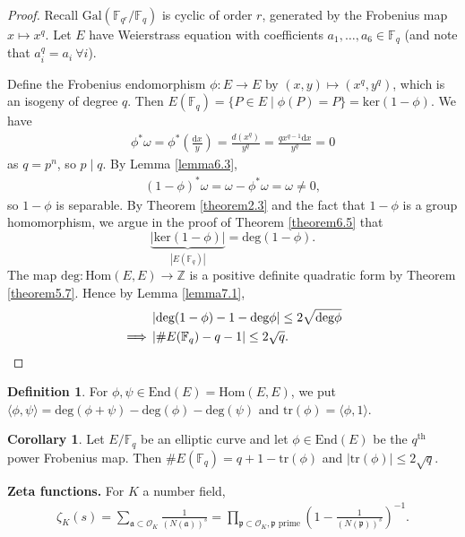 \documentclass{article}
\theoremstyle{definition}
\newtheorem{cor}[theorem]{Corollary}
\newtheorem{defn}{Definition}[section]
\begin{document}
\begin{proof}
    Recall $\text{Gal}(\mathbb{F}_{q^r}/\mathbb{F}_q)$ is cyclic of order $r$, generated by the Frobenius map $x \mapsto x^q$. Let $E$ have Weierstrass equation with coefficients $a_1,\ldots,a_6 \in \mathbb{F}_q$ (and note that $a_i^q = a_i ~\forall i$). 
    \vspace{1mm}
     
    Define the Frobenius endomorphism $\phi: E \to E$ by $(x,y) \mapsto (x^q,y^q)$, which is an isogeny of degree $q$. Then $E(\mathbb{F}_q) = \{P \in E \mid \phi(P) = P\} = \text{ker}(1-\phi)$. We have
    \begin{align*}
        \phi^* \omega = \phi^* \left(\frac{\mathrm{d}x}{y}\right) = \frac{d(x^q)}{y^q} = \frac{qx^{q-1}\mathrm{d}x}{y^q} = 0
    \end{align*}
    as $q=p^n$, so $p \mid q$. By Lemma \ref{lemma6.3},
    \begin{align*}
        (1-\phi)^* \omega = \omega - \phi^* \omega = \omega \neq 0,
    \end{align*}
    so $1-\phi$ is separable. By Theorem \ref{theorem2.3} and the fact that $1-\phi$ is a group homomorphism, we argue in the proof of Theorem \ref{theorem6.5} that $$\underbrace{\left|\text{ker}(1-\phi)\right|}_{\left|E(\mathbb{F}_q)\right|} = \text{deg}(1-\phi).$$
    The map $\text{deg}: \text{Hom}(E,E) \to \mathbb{Z}$ is a positive definite quadratic form by Theorem \ref{theorem5.7}. Hence by Lemma \ref{lemma7.1}, 
    \begin{align*}
        &\left|\text{deg}(1-\phi) - 1 - \text{deg}\phi\right|\le 2\sqrt{\text{deg}\phi}\\
        \implies&\left|\# E(\mathbb{F}_q)-q-1\right| \le 2\sqrt{q}.
        \qedhere
    \end{align*}
\end{proof}
\begin{defn}
    For $\phi, \psi \in \text{End}(E) = \text{Hom}(E,E)$, we put $\langle \phi, \psi \rangle = \text{deg}(\phi+\psi)-\text{deg}(\phi)-\text{deg}(\psi)$ and $\text{tr}(\phi) = \langle \phi,1 \rangle$.
\end{defn}
\begin{cor}\label{cor7.3}
    Let $E/\mathbb{F}_q$ be an elliptic curve and let $\phi \in \text{End}(E)$ be the $q^{\text{th}}$ power Frobenius map. Then $\# E(\mathbb{F}_q) = q+1 - \text{tr}(\phi)$ and $\left|\text{tr}(\phi)\right|\le 2\sqrt{q}$.
\end{cor}
\textbf{Zeta functions.} For $K$ a number field, 
\begin{align*}
    \zeta_K(s) = \sum_{\mathfrak{a} \subset \mathcal{O}_K}^{} \frac{1}{(N(\mathfrak{a}))^s} = \prod_{\mathfrak{p} \subset \mathcal{O}_K, \mathfrak{p} \text{ prime}}^{} \left(1-\frac{1}{(N(\mathfrak{p}))^s}\right)^{-1}.
\end{align*} 
\end{document}
